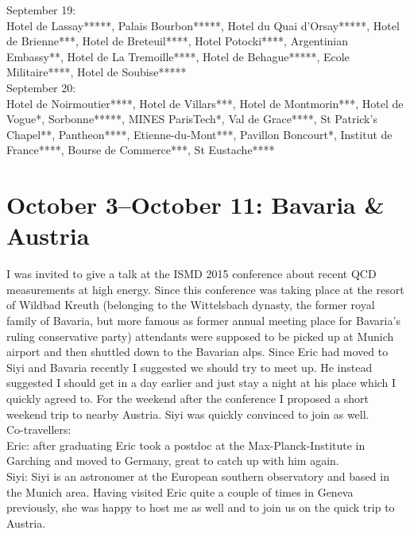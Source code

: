 September 19:\\
Hotel de Lassay*****, Palais Bourbon*****, Hotel du Quai d'Orsay*****, Hotel de Brienne***, Hotel de Breteuil****, Hotel Potocki****, Argentinian Embassy**, Hotel de La Tremoille****, Hotel de Behague*****, Ecole Militaire****, Hotel de Soubise*****\\

September 20:\\
Hotel de Noirmoutier****, Hotel de Villars***, Hotel de Montmorin***, Hotel de Vogue*, Sorbonne*****, MINES ParisTech*, Val de Grace****, St Patrick's Chapel**, Pantheon****, Etienne-du-Mont***, Pavillon Boncourt*, Institut de France****, Bourse de Commerce***, St Eustache****

\section{October 3--October 11: Bavaria \& Austria}
\label{Bavaria2015}

I was invited to give a talk at the ISMD 2015 conference about recent QCD measurements at high energy. Since this conference was taking place at the resort of Wildbad Kreuth (belonging to the Wittelsbach dynasty, the former royal family of Bavaria, but more famous as former annual meeting place for Bavaria's ruling conservative party) attendants were supposed to be picked up at Munich airport and then shuttled down to the Bavarian alps. Since Eric had moved to Siyi and Bavaria recently I suggested we should try to meet up. He instead suggested I should get in a day earlier and just stay a night at his place which I quickly agreed to. For the weekend after the conference I proposed a short weekend trip to nearby Austria. Siyi was quickly convinced to join as well.\\

Co-travellers:\\
Eric: after graduating Eric took a postdoc at the Max-Planck-Institute in Garching and moved to Germany, great to catch up with him again.\\

Siyi: Siyi is an astronomer at the European southern observatory and based in the Munich area. Having visited Eric quite a couple of times in Geneva previously, she was happy to host me as well and to join us on the quick trip to Austria.\\


